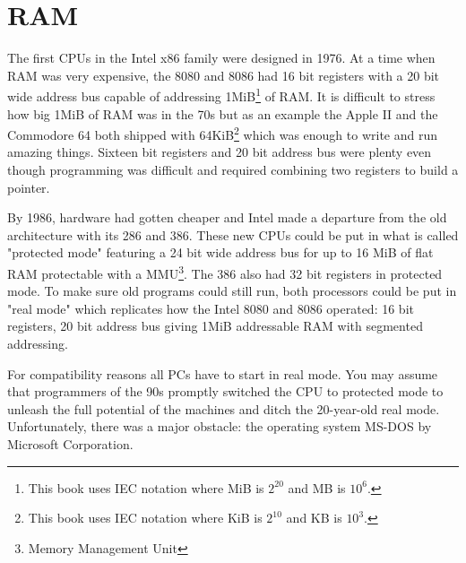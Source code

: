 \documentclass[book.tex]{subfiles}
\begin{document}
\section{RAM}
The first CPUs in the Intel x86 family were designed in 1976. At a time when RAM was very expensive, the 8080 and 8086 had 16 bit registers with a 20 bit wide address bus capable of addressing 1MiB\footnote{This book uses IEC notation where MiB is $2^{20}$ and MB is $10^6$.} of RAM. It is difficult to stress how big 1MiB of RAM was in the 70s but as an example the Apple II and the Commodore 64 both shipped with 64KiB\footnote{This book uses IEC notation where KiB is $2^{10}$ and KB is $10^3$.} which was enough to write and run amazing things. Sixteen bit registers and 20 bit address bus were plenty even though programming was difficult and required combining two registers to build a pointer.\\
\par
By 1986, hardware had gotten cheaper and Intel made a departure from the old architecture with its 286 and 386. These new CPUs could be put in what is called "protected mode" featuring a 24 bit wide address bus for up to 16 MiB of flat RAM protectable with a MMU\footnote{Memory Management Unit}. The 386 also had 32 bit registers in protected mode. To make sure old programs could still run, both processors could be put in "real mode" which replicates how the Intel 8080 and 8086 operated: 16 bit registers, 20 bit address bus giving 1MiB addressable RAM with segmented addressing.\\
\par
For compatibility reasons all PCs have to start in real mode. You may assume that programmers of the 90s promptly switched the CPU to protected mode to unleash the full potential of the machines and ditch the 20-year-old real mode. Unfortunately, there was a major obstacle: the operating system MS-DOS by Microsoft Corporation.
  
\end{document}
